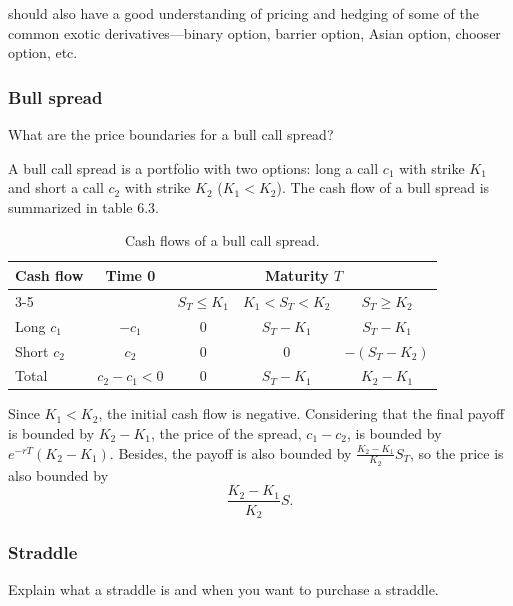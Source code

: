 
should also have a good understanding of pricing and hedging of some of the common
exotic derivatives---binary option, barrier option, Asian option, chooser option, etc.

\subsubsection*{Bull spread}

\begin{problem}{What are the price boundaries for a bull call spread?}
\end{problem}

\begin{solution}
A bull call spread is a portfolio with two options: long a call $c_1$ with strike $K_1$
and short a call $c_2$ with strike $K_2$ ($K_1<K_2$). The cash flow of a bull spread is
summarized in table 6.3.

\begin{table}[H]
\centering
\small
\begin{tabular}{|l|c|c|c|c|}
\hline
Cash flow & Time 0 & \multicolumn{3}{c|}{Maturity $T$} \\
\cline{3-5}
 & & $S_T\leq K_1$ & $K_1<S_T<K_2$ & $S_T\geq K_2$ \\
\hline
Long $c_1$ & $-c_1$ & 0 & $S_T-K_1$ & $S_T-K_1$ \\
\hline
Short $c_2$ & $c_2$ & 0 & 0 & $-(S_T-K_2)$ \\
\hline
Total & $c_2-c_1<0$ & 0 & $S_T-K_1$ & $K_2-K_1$ \\
\hline
\end{tabular}
\caption{Cash flows of a bull call spread.}
\label{tab:zhou-table-6-3}
\end{table}

Since $K_1<K_2$, the initial cash flow is negative. Considering that the final payoff is
bounded by $K_2-K_1$, the price of the spread, $c_1-c_2$, is bounded by
$e^{-rT}(K_2-K_1)$. Besides, the payoff is also bounded by
$\frac{K_2-K_1}{K_2}S_T$, so the price is also bounded by
\[
\frac{K_2-K_1}{K_2}S.
\]

\end{solution}

\subsubsection*{Straddle}

\begin{problem}{Explain what a straddle is and when you want to purchase a straddle.}
\end{problem}

